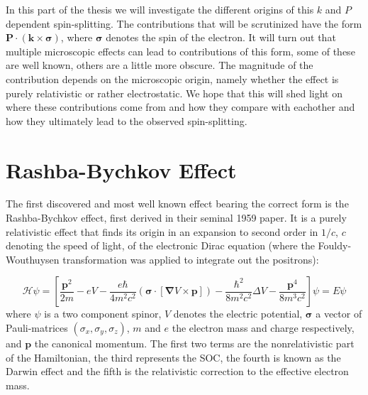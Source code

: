 In this part of the thesis we will investigate the different origins of this $k$ and $P$ dependent spin-splitting. The contributions that will be scrutinized have the form $\mathbf{P} \cdot (\mathbf{k} \times \mathbf{\sigma})$, where $\mathbf{\sigma}$ denotes the spin of the electron. It will turn out that multiple microscopic effects can lead to contributions of this form, some of these are well known, others are a little more obscure. The magnitude of the contribution depends on the microscopic origin, namely whether the effect is purely relativistic or rather electrostatic.
We hope that this will shed light on where these contributions come from and how they compare with eachother and how they ultimately lead to the observed spin-splitting.

\section{Rashba-Bychkov Effect}
The first discovered and most well known effect bearing the correct form is the Rashba-Bychkov effect, first derived in their seminal 1959 paper\cite{Rashba1959SymmetryAr}. It is a purely relativistic effect that finds its origin in an expansion to second order in $1/c$, $c$ denoting the speed of light, of the electronic Dirac equation (where the Fouldy-Wouthuysen transformation was applied to integrate out the positrons):

\begin{equation}
	\mathcal{H} \psi = \left[\frac{\bm{p}^2}{2m} - e V - \frac{e \hbar}{4m^2c^2}(\bm{\sigma}\cdot[\bm{\nabla}V \times \bm{p}]) - \frac{\hbar^2}{8m^2c^2} \Delta V - \frac{\bm{p}^4}{8m^3c^2}\right]\psi = E\psi
\end{equation}
where $\psi$ is a two component spinor, $V$ denotes the electric potential, $\bm{\sigma}$ a vector of Pauli-matrices $(\sigma_x, \sigma_y, \sigma_z)$, $m$ and $e$ the electron mass and charge respectively, and $\bm{p}$ the canonical momentum. The first two terms are the nonrelativistic part of the Hamiltonian, the third represents the SOC, the fourth is known as the Darwin effect and the fifth is the relativistic correction to the effective electron mass. 


